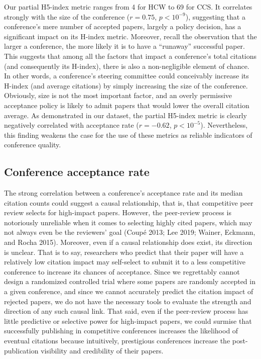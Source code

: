\documentclass{article}
\begin{document}
Our partial H5-index metric ranges from
4 for HCW to
69 for CCS.
It correlates strongly with the size of the conference
(\(r=0.75\), \(p<10^{-9}\)),
suggesting that a conference's mere number of accepted papers, largely a policy decision, has a significant impact on its H-index metric.
Moreover, recall the observation that the larger a conference, the more likely it is to have a ``runaway'' successful paper.
This suggests that among all the factors that impact a conference's total citations (and consequently its H-index), there is also a non-negligible element of chance.
In other words, a conference's steering committee could conceivably increase its H-index (and average citations) by simply increasing the size of the conference.
Obviously, size is not the most important factor, and an overly permissive acceptance policy is likely to admit papers that would lower the overall citation average.
As demonstrated in our dataset, the partial H5-index metric is clearly negatively correlated with acceptance rate
(\(r=-0.62\), \(p<10^{-5}\)).
Nevertheless, this finding weakens the case for the use of these metrics as reliable indicators of conference quality.

\hypertarget{conference-acceptance-rate}{%
\subsection{Conference acceptance rate}\label{conference-acceptance-rate}}

The strong correlation between a conference's acceptance rate and its median citation counts could suggest a causal relationship, that is, that competitive peer review selects for high-impact papers.
However, the peer-review process is notoriously unreliable when it comes to selecting highly cited papers, which may not always even be the reviewers' goal (Coupé 2013; Lee 2019; Wainer, Eckmann, and Rocha 2015).
Moreover, even if a causal relationship does exist, its direction is unclear.
That is to say, researchers who predict that their paper will have a relatively low citation impact may self-select to submit it to a less competitive conference to increase its chances of acceptance.
Since we regrettably cannot design a randomized controlled trial where some papers are randomly accepted in a given conference, and since we cannot accurately predict the citation impact of rejected papers, we do not have the necessary tools to evaluate the strength and direction of any such causal link.
That said, even if the peer-review process has little predictive or selective power for high-impact papers, we could surmise that successfully publishing in competitive conferences increases the likelihood of eventual citations because intuitively, prestigious conferences increase the post-publication visibility and credibility of their papers.
\end{document}
